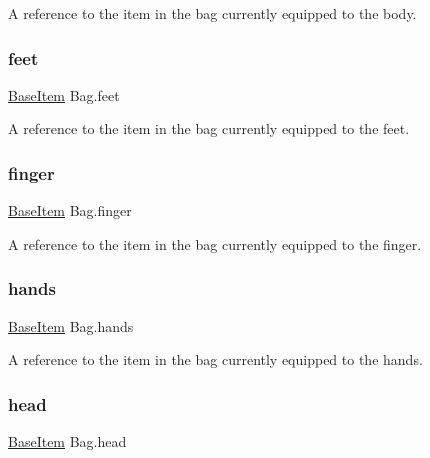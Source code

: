 A reference to the item in the bag currently equipped to the body. 

\mbox{\label{class_bag_a45172ef71e457ce9c818866fc0ffd5c2}} 
\subsubsection{\texorpdfstring{feet}{feet}}
{\footnotesize\ttfamily \mbox{\hyperlink{class_base_item}{Base\+Item}} Bag.\+feet\hspace{0.3cm}{\ttfamily [get]}}



A reference to the item in the bag currently equipped to the feet. 

\mbox{\label{class_bag_a0517877fdabd6917389995deecabe057}} 
\subsubsection{\texorpdfstring{finger}{finger}}
{\footnotesize\ttfamily \mbox{\hyperlink{class_base_item}{Base\+Item}} Bag.\+finger\hspace{0.3cm}{\ttfamily [get]}}



A reference to the item in the bag currently equipped to the finger. 

\mbox{\label{class_bag_a19700ba62882ea2e03f954a6b4f267fa}} 
\subsubsection{\texorpdfstring{hands}{hands}}
{\footnotesize\ttfamily \mbox{\hyperlink{class_base_item}{Base\+Item}} Bag.\+hands\hspace{0.3cm}{\ttfamily [get]}}



A reference to the item in the bag currently equipped to the hands. 

\mbox{\label{class_bag_aad83c56a14d611f6e1d2fac81903d66c}} 
\subsubsection{\texorpdfstring{head}{head}}
{\footnotesize\ttfamily \mbox{\hyperlink{class_base_item}{Base\+Item}} Bag.\+head\hspace{0.3cm}{\ttfamily [get]}}



